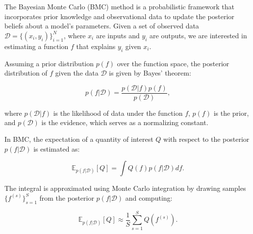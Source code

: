 

The Bayesian Monte Carlo (BMC) method is a probabilistic framework that incorporates prior knowledge and observational data to update the posterior beliefs about a model's parameters. Given a set of observed data \( \mathcal{D} = \{ (x_i, y_i) \}_{i=1}^{N} \), where \( x_i \) are inputs and \( y_i \) are outputs, we are interested in estimating a function \( f \) that explains \( y_i \) given \( x_i \).

Assuming a prior distribution \( p(f) \) over the function space, the posterior distribution of \( f \) given the data \( \mathcal{D} \) is given by Bayes' theorem:

\begin{equation}
p(f|\mathcal{D}) = \frac{p(\mathcal{D}|f)p(f)}{p(\mathcal{D})},
\end{equation}

where \( p(\mathcal{D}|f) \) is the likelihood of data under the function \( f \), \( p(f) \) is the prior, and \( p(\mathcal{D}) \) is the evidence, which serves as a normalizing constant.

In BMC, the expectation of a quantity of interest \( Q \) with respect to the posterior \( p(f|\mathcal{D}) \) is estimated as:

\begin{equation}
\mathbb{E}_{p(f|\mathcal{D})}[Q] = \int Q(f)p(f|\mathcal{D}) df.
\end{equation}

The integral is approximated using Monte Carlo integration by drawing samples \( \{ f^{(s)} \}_{s=1}^{S} \) from the posterior \( p(f|\mathcal{D}) \) and computing:

\begin{equation}
\mathbb{E}_{p(f|\mathcal{D})}[Q] \approx \frac{1}{S} \sum_{s=1}^{S} Q(f^{(s)}).
\end{equation}


